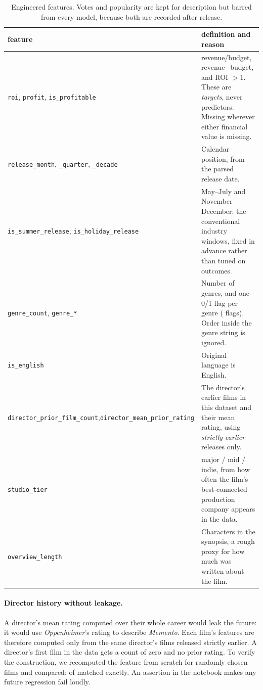 \documentclass[a4paper,12pt]{report}
\newcommand{\code}[1]{\texttt{#1}}
\begin{document}
\begin{table}[htbp]
\centering\small
\begin{tabular}{>{\raggedright\arraybackslash}p{5.9cm}p{9.3cm}}
\toprule
feature & definition and reason \\
\midrule
\code{roi}, \code{profit}, \code{is\_profitable} & revenue/budget, revenue$-$budget, and ROI $>1$. These are \emph{targets}, never predictors. Missing wherever either financial value is missing. \\
\code{release\_month}, \code{\_quarter}, \code{\_decade} & Calendar position, from the parsed release date. \\
\code{is\_summer\_release}, \code{is\_holiday\_release} & May--July and November--December: the conventional industry windows, fixed in advance rather than tuned on outcomes. \\
\code{genre\_count}, \code{genre\_*} & Number of genres, and one 0/1 flag per genre (\UniNGenres{} flags). Order inside the genre string is ignored. \\
\code{is\_english} & Original language is English. \\
\code{director\_prior\_film\_count},\newline \code{director\_mean\_prior\_rating} & The director's earlier films in this dataset and their mean rating, using \emph{strictly earlier} releases only. \\
\code{studio\_tier} & major / mid / indie, from how often the film's best-connected production company appears in the data. \\
\code{overview\_length} & Characters in the synopsis, a rough proxy for how much was written about the film. \\
\bottomrule
\end{tabular}
\caption{Engineered features. Votes and popularity are kept for description but barred from every model, because both are recorded after release.}
\label{tab:features}
\end{table}

\paragraph{Director history without leakage.} A director's mean rating computed over their whole career would leak the future: it would use \emph{Oppenheimer}'s rating to describe \emph{Memento}. Each film's features are therefore computed only from the same director's films released strictly earlier. A director's first film in the data gets a count of zero and no prior rating. To verify the construction, we recomputed the feature from scratch for \FeatDirectorCheckN{} randomly chosen films and compared: \FeatDirectorCheckMatched{} of \FeatDirectorCheckN{} matched exactly. An assertion in the notebook makes any future regression fail loudly.
\end{document}
